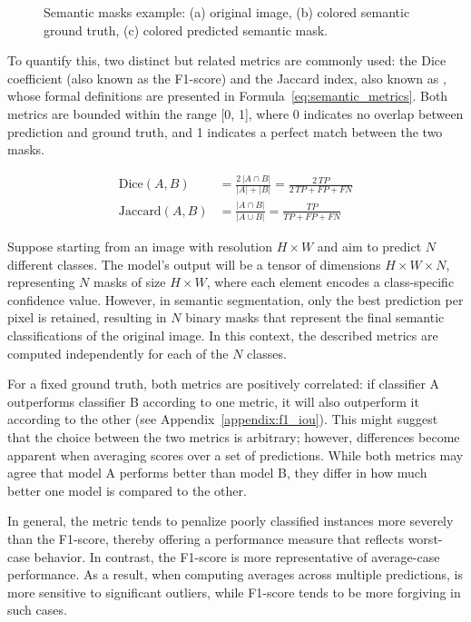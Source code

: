 \begin{figure}[htbp]
    \caption{Semantic masks example: (a) original image, (b) colored semantic ground truth, (c) colored predicted semantic mask.}
    \label{fig:semantic_masks}
\end{figure}

To quantify this, two distinct but related metrics are commonly used: the Dice coefficient (also known as the F1-score) and the Jaccard index, also known as , whose formal definitions are presented in Formula~\ref{eq:semantic_metrics}. Both metrics are bounded within the range [0, 1], where 0 indicates no overlap between prediction and ground truth, and 1 indicates a perfect match between the two masks.

\begin{equation}
    \begin{aligned}
    \text{Dice}(A, B) &= \frac{2\,|A \cap B|}{|A| + |B|} = \frac{2\,TP}{2\,TP + FP + FN} \\
    \text{Jaccard}(A, B)  &= \frac{|A \cap B|}{|A \cup B|} = \frac{TP}{TP + FP + FN}
    \end{aligned}
    \label{eq:semantic_metrics}
\end{equation}

Suppose starting from an image with resolution $H \times W$ and aim to predict $N$ different classes. The model's output will be a tensor of dimensions $H \times W \times N$, representing $N$ masks of size $H \times W$, where each element encodes a class-specific confidence value. However, in semantic segmentation, only the best prediction per pixel is retained, resulting in $N$ binary masks that represent the final semantic classifications of the original image. In this context, the described metrics are computed independently for each of the $N$ classes.

For a fixed ground truth, both metrics are positively correlated: if classifier A outperforms classifier B according to one metric, it will also outperform it according to the other (see Appendix~\ref{appendix:f1_iou}). This might suggest that the choice between the two metrics is arbitrary; however, differences become apparent when averaging scores over a set of predictions. While both metrics may agree that model A performs better than model B, they differ in how much better one model is compared to the other.

In general, the  metric tends to penalize poorly classified instances more severely than the F1-score, thereby offering a performance measure that reflects worst-case behavior. In contrast, the F1-score is more representative of average-case performance. As a result, when computing averages across multiple predictions,  is more sensitive to significant outliers, while F1-score tends to be more forgiving in such cases.

